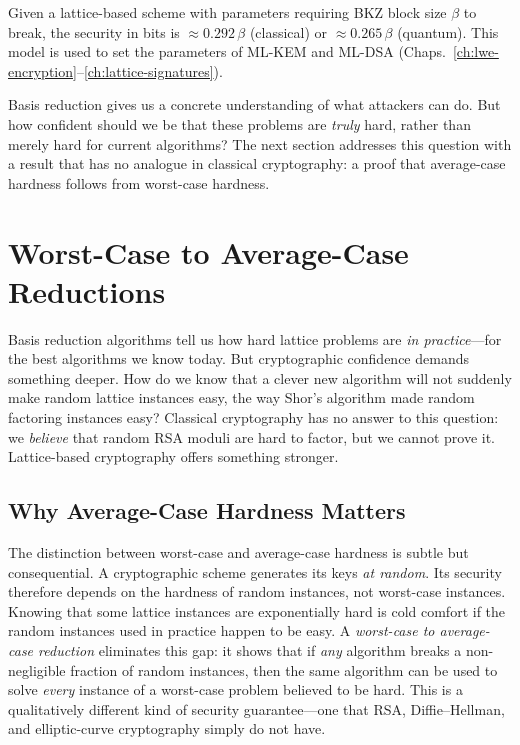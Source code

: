 Given a lattice-based scheme with parameters requiring BKZ block size $\beta$ to break, the security in bits is $\approx 0.292\,\beta$ (classical) or $\approx 0.265\,\beta$ (quantum).  This model is used to set the parameters of ML-KEM and ML-DSA (Chaps.~\ref{ch:lwe-encryption}--\ref{ch:lattice-signatures}).

Basis reduction gives us a concrete understanding of what attackers can do.  But how confident should we be that these problems are \emph{truly} hard, rather than merely hard for current algorithms?  The next section addresses this question with a result that has no analogue in classical cryptography: a proof that average-case hardness follows from worst-case hardness.


\section{Worst-Case to Average-Case Reductions}
\label{sec:worst-avg-case}

Basis reduction algorithms tell us how hard lattice problems are \emph{in practice}---for the best algorithms we know today.  But cryptographic confidence demands something deeper.  How do we know that a clever new algorithm will not suddenly make random lattice instances easy, the way Shor's algorithm made random factoring instances easy?  Classical cryptography has no answer to this question: we \emph{believe} that random RSA moduli are hard to factor, but we cannot prove it.  Lattice-based cryptography offers something stronger.

\subsection{Why Average-Case Hardness Matters}
\label{subsec:avg-case-matters}

The distinction between worst-case and average-case hardness is subtle but consequential.  A cryptographic scheme generates its keys \emph{at random}.  Its security therefore depends on the hardness of random instances, not worst-case instances.  Knowing that some lattice instances are exponentially hard is cold comfort if the random instances used in practice happen to be easy.  A \emph{worst-case to average-case reduction} eliminates this gap: it shows that if \emph{any} algorithm breaks a non-negligible fraction of random instances, then the same algorithm can be used to solve \emph{every} instance of a worst-case problem believed to be hard.  This is a qualitatively different kind of security guarantee---one that RSA, Diffie--Hellman, and elliptic-curve cryptography simply do not have.

